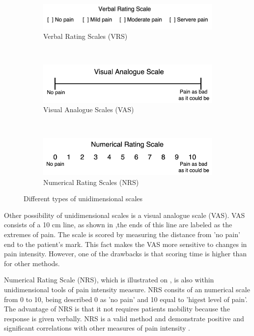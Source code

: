 \begin{figure}
\begin{subfigure}{0.8\textwidth}
  \centering
  \includegraphics[width=0.8\linewidth]{figures/VRS.png}
  \caption{Verbal Rating Scales (VRS)}
  \label{fig:VRS}
\end{subfigure} \\
\begin{subfigure}{0.8\textwidth}
  \centering
  \includegraphics[width=0.8\linewidth]{figures/VAS.png}
  \caption{Visual Analogue Scales (VAS)}
  \label{fig:VAS}
\end{subfigure} \\
\begin{subfigure}{0.8\textwidth}
  \centering
  \includegraphics[width=0.8\linewidth]{figures/NRS.png}
  \caption{Numerical Rating Scales (NRS)}
  \label{fig:NRS}
\end{subfigure}
\caption{Different types of unidimensional scales}
\label{fig:fig}
\end{figure}


Other possibility of unidimensional scales is a visual analogue scale (VAS). VAS consists of a 10 cm line, as shown in ,the ends of this line are labeled as the extremes of pain. The scale is scored by measuring the distance from 'no pain' end to the patient's mark. This fact makes the VAS more sensitive to changes in pain intensity. However, one of the drawbacks is that scoring time is higher than for other methods. 

Numerical Rating Scale (NRS), which is illustrated on , is also within unidimensional tools of pain intensity measure. NRS consits of an numerical scale from 0 to 10, being described 0 as 'no pain' and  10 equal to 'higest level of pain'. The advantage of NRS is that it not requires patients mobility because the response is given verbally. NRS is a valid method and demonstrate positive and significant correlations with other measures of pain intensity \cite{Jensen1986}. 

